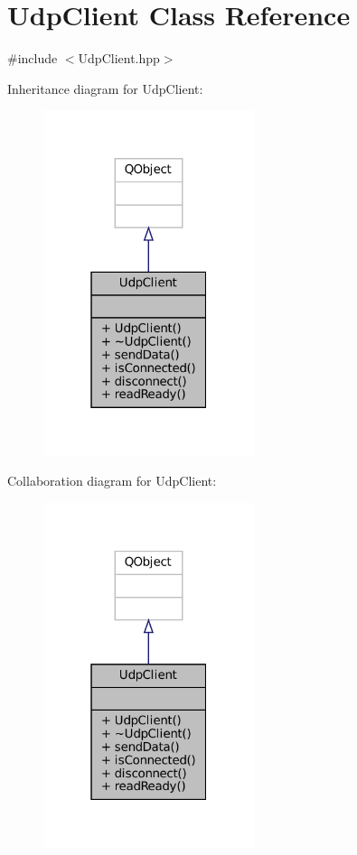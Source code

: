 \hypertarget{classUdpClient}{}\section{Udp\+Client Class Reference}
\label{classUdpClient}


{\ttfamily \#include $<$Udp\+Client.\+hpp$>$}



Inheritance diagram for Udp\+Client\+:
\nopagebreak
\begin{figure}[H]
\begin{center}
\leavevmode
\includegraphics[width=175pt]{classUdpClient__inherit__graph}
\end{center}
\end{figure}


Collaboration diagram for Udp\+Client\+:
\nopagebreak
\begin{figure}[H]
\begin{center}
\leavevmode
\includegraphics[width=175pt]{classUdpClient__coll__graph}
\end{center}
\end{figure}
